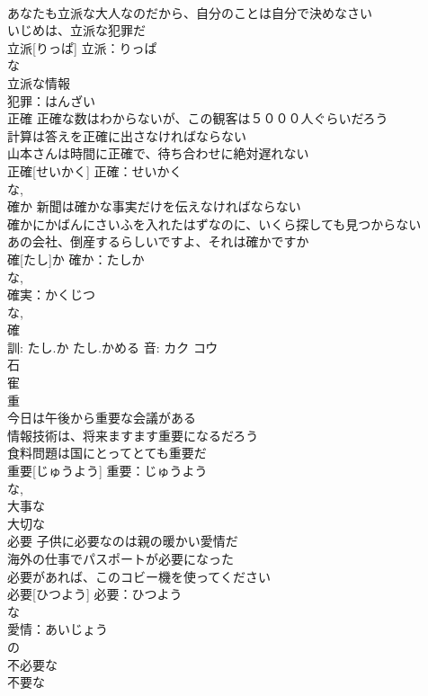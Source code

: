 \documentclass[8pt]{extreport}
\begin{document}
\begin{CJK}{UTF8}{min}
\\	あなたも立派な大人なのだから、自分のことは自分で決めなさい 
\\	いじめは、立派な犯罪だ 
\\	立派[りっぱ]			立派：りっぱ
\\	な 
\\	立派な情報 
\\	犯罪：はんざい
\\	正確	正確な数はわからないが、この観客は５０００人ぐらいだろう 
\\	計算は答えを正確に出さなければならない 
\\	山本さんは時間に正確で、待ち合わせに絶対遅れない 
\\	正確[せいかく]				正確：せいかく
\\	な, 
\\	確か	新聞は確かな事実だけを伝えなければならない 
\\	確かにかばんにさいふを入れたはずなのに、いくら探しても見つからない 
\\	あの会社、倒産するらしいですよ、それは確かですか 
\\	確[たし]か			確か：たしか
\\	な, 
\\	確実：かくじつ
\\	な, 
\\	確 
\\	訓: たし.か たし.かめる 音: カク コウ 
\\	石 
\\	寉 
\\	重
\\	今日は午後から重要な会議がある 
\\	情報技術は、将来ますます重要になるだろう 
\\	食料問題は国にとってとても重要だ 
\\	重要[じゅうよう]			重要：じゅうよう
\\	な, 
\\	大事な 
\\	大切な 
\\	必要	子供に必要なのは親の暖かい愛情だ 
\\	海外の仕事でパスポートが必要になった 
\\	必要があれば、このコビー機を使ってください 
\\	必要[ひつよう]			必要：ひつよう
\\	な 
\\	愛情：あいじょう
\\	の 
\\	不必要な 
\\	不要な 

\end{CJK}
\end{document}
